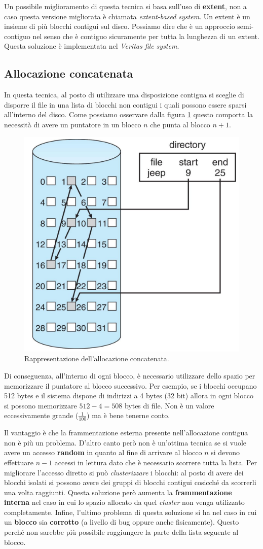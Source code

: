 Un possibile miglioramento di questa tecnica si basa sull'uso di \textbf{extent}, non a caso questa versione migliorata è chiamata \textit{extent-based system}. Un extent è un insieme di più blocchi contigui sul disco. Possiamo dire che è un approccio semi-contiguo nel senso che è contiguo sicuramente per tutta la lunghezza di un extent. Questa soluzione è implementata nel \textit{Veritas file system}. 

% 
\subsection{Allocazione concatenata}
In questa tecnica, al posto di utilizzare una disposizione contigua si sceglie di disporre il file in una lista di blocchi non contigui i quali possono essere sparsi all'interno del disco. Come possiamo osservare dalla figura \ref{fig:allocazione concatenata} questo comporta la necessità di avere un puntatore in un blocco $n$ che punta al blocco $n + 1$.
\begin{figure}[h]
    \centering
    \includegraphics[width = .5\textwidth]{../res/imgs/file system implementation/allocazione concatenata.png}
    \caption{Rappresentazione dell'allocazione concatenata.}
    \label{fig:allocazione concatenata}
\end{figure}
Di conseguenza, all'interno di ogni blocco, è necessario utilizzare dello spazio per memorizzare il puntatore al blocco successivo. Per esempio, se i blocchi occupano 512 bytes e il sistema dispone di indirizzi a 4 bytes (32 bit) allora in ogni blocco si possono memorizzare $512 - 4 = 508$ bytes di file. Non è un valore eccessivamente grande ($\frac{1}{100}$) ma è bene tenerne conto.

Il vantaggio è che la frammentazione esterna presente nell'allocazione contigua non è più un problema. D'altro canto però non è un'ottima tecnica se si vuole avere un accesso \textbf{random} in quanto al fine di arrivare al blocco $n$ si devono effettuare $n - 1$ accessi in lettura dato che è necessario scorrere tutta la lista. Per migliorare l'accesso diretto si può \textit{clusterizzare} i blocchi: al posto di avere dei blocchi isolati si possono avere dei gruppi di blocchi contigui cosicché da scorrerli una volta raggiunti. Questa soluzione però aumenta la \textbf{frammentazione interna} nel caso in cui lo spazio allocato da quel \textit{cluster} non venga utilizzato completamente. Infine, l'ultimo problema di questa soluzione si ha nel caso in cui un \textbf{blocco} sia \textbf{corrotto} (a livello di bug oppure anche fisicamente). Questo perché non sarebbe più possibile raggiungere la parte della lista seguente al blocco.

